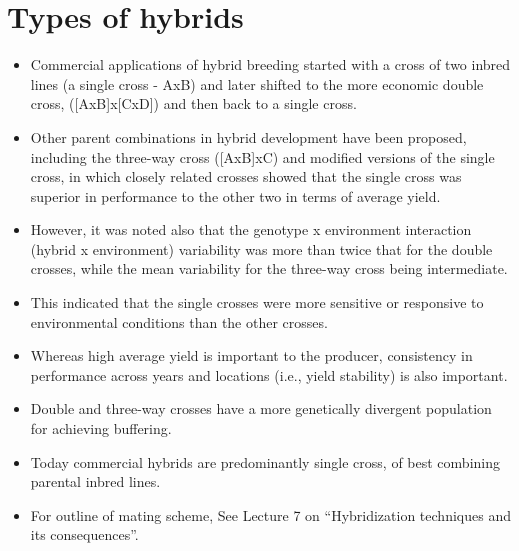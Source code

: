 \documentclass[11pt,ignorenonframetext,aspectratio=169]{beamer}
\providecommand{\tightlist}{%
  \setlength{\itemsep}{0pt}\setlength{\parskip}{0pt}}
\begin{document}
\hypertarget{types-of-hybrids}{%
\section{Types of hybrids}\label{types-of-hybrids}}

\begin{frame}{}
\protect\hypertarget{section-6}{}
\begin{itemize}
\tightlist
\item
  Commercial applications of hybrid breeding started with a cross of two
  inbred lines (a single cross - AxB) and later shifted to the more
  economic double cross, ({[}AxB{]}x{[}CxD{]}) and then back to a single
  cross.
\item
  Other parent combinations in hybrid development have been proposed,
  including the three-way cross ({[}AxB{]}xC) and modified versions of
  the single cross, in which closely related crosses showed that the
  single cross was superior in performance to the other two in terms of
  average yield.
\item
  However, it was noted also that the genotype x environment interaction
  (hybrid x environment) variability was more than twice that for the
  double crosses, while the mean variability for the three-way cross
  being intermediate.
\end{itemize}
\end{frame}

\begin{frame}{}
\protect\hypertarget{section-7}{}
\begin{itemize}
\tightlist
\item
  This indicated that the single crosses were more sensitive or
  responsive to environmental conditions than the other crosses.
\item
  Whereas high average yield is important to the producer, consistency
  in performance across years and locations (i.e., yield stability) is
  also important.
\item
  Double and three-way crosses have a more genetically divergent
  population for achieving buffering.
\item
  Today commercial hybrids are predominantly single cross, of best
  combining parental inbred lines.
\item
  For outline of mating scheme, See Lecture 7 on ``Hybridization
  techniques and its consequences''.
\end{itemize}
\end{frame}
\end{document}
